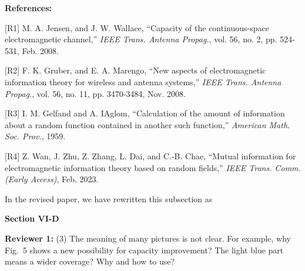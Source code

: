 \documentclass[a4paper,12pt]{article}
\newcommand{\red}[1]{{\color{red}{#1}}}
\begin{document}
{{\bf References:}

[R1] M. A. Jensen, and J. W. Wallace, ``Capacity of the continuous-space electromagnetic channel,'' {\it IEEE Trans. Antenna Propag.}, vol. 56, no. 2, pp. 524-531, Feb. 2008. 

[R2] F. K. Gruber, and E. A. Marengo, ``New aspects of electromagnetic information theory for wireless and antenna systems,'' {\it IEEE Trans. Antenna Propag.}, vol. 56, no. 11, pp. 3470-3484, Nov. 2008. 

[R3] I. M. Gelfand and A. IAglom, ``Calculation of the amount of information about a random function contained in another such function,'' {\it American Math. Soc. Prov.}, 1959. 

[R4] Z. Wan, J. Zhu, Z. Zhang, L. Dai, and C.-B. Chae, ``Mutual information for electromagnetic information theory based on random fields,'' {\it IEEE Trans. Comm. (Early Access)}, Feb. 2023. 


\quad In the revised paper, we have rewritten this subsection as 

}

\begin{framed}
    {\bf Section VI-D} \\
    \red{In classical information theory, the ``capacity'' is defined as the supremum of all the operationally achievable transmission rates. It is favorable that in discrete memoryless systems, the capacity equals the maximum mutual information, but this conclusion is generally not true for all kinds of channels. In the existing works on EIT~[7, 8, 14], maximum mutual information values are calculated under the assumptions of monochromatic waves, linear deterministic EM channels and continuous transceivers. Unfortunately, these mutual information values only serve as an upper bound to the EM capacity. 
    Thus, in the strict sense, the EM capacity is still an open problem. } 
\end{framed}




\textbf{Reviewer 1:}
(3) The meaning of many pictures is not clear. For example, why Fig.~5 shows a new possibility for capacity improvement? The light blue part means a wider coverage? Why and how to use? 
\end{document}
